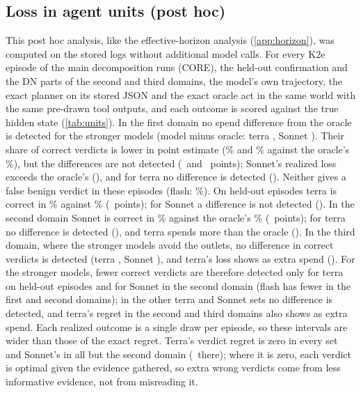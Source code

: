 \subsection{Loss in agent units (post hoc)}\label{app:units}
This post hoc analysis, like the effective-horizon analysis (\cref{app:horizon}), was computed on the stored logs without additional model calls. For every K2e episode of the main decomposition runs (CORE), the held-out confirmation and the DN parts of the second and third domains, the model's own trajectory, the exact planner on its stored JSON and the exact oracle act in the same world with the same pre-drawn tool outputs, and each outcome is scored against the true hidden state (\cref{tab:units}).
In the first domain no spend difference from the oracle is detected for the stronger models (model minus oracle: terra \uMainTerraCostDiffCI, Sonnet \uMainSonnetCostDiffCI). Their share of correct verdicts is lower in point estimate (\uMainTerraCorrect\% and \uMainSonnetCorrect\% against the oracle's \uMainTerraCorrectOracle\%), but the differences are not detected (\uMainTerraCorrectDiffCI\ and \uMainSonnetCorrectDiffCI\ points); Sonnet's realized loss exceeds the oracle's (\uMainSonnetRealisedDiffCI), and for terra no difference is detected (\uMainTerraRealisedDiffCI). Neither gives a false benign verdict in these episodes (flash: \uMainFlashSevere\%). On held-out episodes terra is correct in \uHeldTerraCorrect\% against \uHeldTerraCorrectOracle\% (\uHeldTerraCorrectDiffCI\ points); for Sonnet a difference is not detected (\uHeldSonnetCorrectDiffCI).
In the second domain Sonnet is correct in \uDtwoSonnetCorrect\% against the oracle's \uDtwoSonnetCorrectOracle\% (\uDtwoSonnetCorrectDiffCI\ points); for terra no difference is detected (\uDtwoTerraCorrectDiffCI), and terra spends more than the oracle (\uDtwoTerraCostDiffCI). In the third domain, where the stronger models avoid the outlets, no difference in correct verdicts is detected (terra \uDthreeTerraCorrectDiffCI, Sonnet \uDthreeSonnetCorrectDiffCI), and terra's loss shows as extra spend (\uDthreeTerraCostDiffCI). For the stronger models, fewer correct verdicts are therefore detected only for terra on held-out episodes and for Sonnet in the second domain (flash has fewer in the first and second domains); in the other terra and Sonnet sets no difference is detected, and terra's regret in the second and third domains also shows as extra spend.
Each realized outcome is a single draw per episode, so these intervals are wider than those of the exact regret. Terra's verdict regret is zero in every set and Sonnet's in all but the second domain (\ddSonnetVerdict\ there); where it is zero, each verdict is optimal given the evidence gathered, so extra wrong verdicts come from less informative evidence, not from misreading it.
